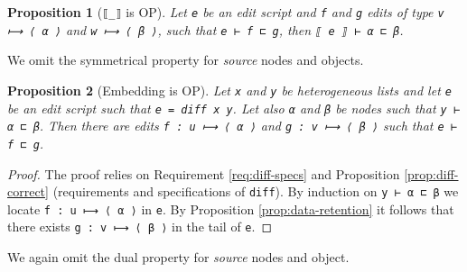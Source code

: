 \documentclass{sigplanconf}
\theoremstyle{plain}
\newtheorem{prop}{Proposition}
\begin{document}
\begin{prop}[\texttt{⟦\_⟧} is OP]
\label{prop:order-preserving-target-fun}
Let \texttt{e} be an edit script and \texttt{f} and \texttt{g} edits
of type \texttt{v ⟼ ⟨ α ⟩} and \texttt{w ⟼ ⟨ β ⟩}, such that
\texttt{e ⊢ f ⊏ g}, then \texttt{⟦ e ⟧ ⊢ α ⊏ β}.
\end{prop}
  We omit the symmetrical property for \emph{source} nodes and objects.

\begin{prop}[Embedding is OP]
\label{prop:order-preserving-embedding}
Let \texttt{x} and \texttt{y} be heterogeneous lists and let 
\texttt{e} be an edit script such that \texttt{e = diff x y}.
Let also \texttt{α} and \texttt{β} be nodes such that \texttt{y ⊢ α ⊏ β}.
Then there are edits \texttt{f : u ⟼ ⟨ α ⟩} and \texttt{g : v ⟼ ⟨ β ⟩}
such that \texttt{e ⊢ f ⊏ g}.
\end{prop}
\begin{proof}
  The proof relies on Requirement \ref{req:diff-specs} and Proposition
  \ref{prop:diff-correct} (requirements and specifications of
  \texttt{diff}).
  By induction on \texttt{y ⊢ α ⊏ β} we locate \texttt{f : u ⟼ ⟨ α ⟩}
  in \texttt{e}. 
  By Proposition \ref{prop:data-retention} it follows that there
  exists \texttt{g : v ⟼ ⟨ β ⟩} in the tail of \texttt{e}.
\end{proof}
We again omit the dual property for \emph{source} nodes and object.
\end{document}
